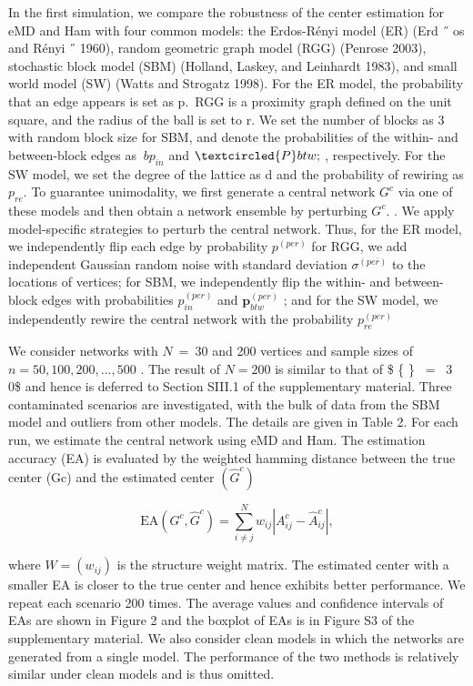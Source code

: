 \documentclass[
  10
]{article}
\begin{document}
In the first simulation, we compare the robustness of the center
estimation for eMD and Ham with four common models: the Erdos-Rényi
model (ER) (Erd ˝ os and Rényi ˝ 1960), random geometric graph model
(RGG) (Penrose 2003), stochastic block model (SBM) (Holland, Laskey, and
Leinhardt 1983), and small world model (SW) (Watts and Strogatz 1998).
For the ER model, the probability that an edge appears is set as p.~RGG
is a proximity graph defined on the unit square, and the radius of the
ball is set to r. We set the number of blocks as 3 with random block
size for SBM, and denote the probabilities of the within- and
between-block edges as \(\ b { p } _ { i n }\) and
\(\textcircled { P } b t w ;\) , respectively. For the SW model, we set
the degree of the lattice as d and the probability of rewiring as
\(\mathit { p } _ { r e } .\) To guarantee unimodality, we first
generate a central network \(G ^ { c }\) via one of these models and
then obtain a network ensemble by perturbing \(G ^ { c } .\) . We apply
model-specific strategies to perturb the central network. Thus, for the
ER model, we independently flip each edge by probability
\(p ^ { ( p e r ) }\) for RGG, we add independent Gaussian random noise
with standard deviation \(\sigma ^ { ( p e \bar { r } ) }\) to the
locations of vertices; for SBM, we independently flip the within- and
between-block edges with probabilities \(p _ { i n } ^ { ( p e r ) }\)
and \(\boldsymbol { p } _ { b t w } ^ { ( p e r ) }\) ; and for the SW
model, we independently rewire the central network with the probability
\(p _ { r e } ^ { ( p e r ) }\)

We consider networks with \(N ~ = ~ 3 0\) and 200 vertices and sample
sizes of \(n = 5 0 , 1 0 0 , 2 0 0 , . . . , 5 0 0\) . The result of
\(N = 2 0 0\) is similar to that of \$ \{  \} ~= ~3 0\$
and hence is deferred to Section SIII.1 of the supplementary material.
Three contaminated scenarios are investigated, with the bulk of data
from the SBM model and outliers from other models. The details are given
in Table 2. For each run, we estimate the central network using eMD and
Ham. The estimation accuracy (EA) is evaluated by the weighted hamming
distance between the true center (Gc) and the estimated center
\(( \hat { G } ^ { c } )\)

\[
\mathrm{EA} (G ^ {c}, \hat {G} ^ {c}) = \sum_ {i \neq j} ^ {N} w _ {i j} \left| A _ {i j} ^ {c} - \hat {A} _ {i j} ^ {c} \right|,\tag{12}
\]

where \(W = ( w _ { i j } )\) is the structure weight matrix. The
estimated center with a smaller EA is closer to the true center and
hence exhibits better performance. We repeat each scenario 200 times.
The average values and confidence intervals of EAs are shown in Figure 2
and the boxplot of EAs is in Figure S3 of the supplementary material. We
also consider clean models in which the networks are generated from a
single model. The performance of the two methods is relatively similar
under clean models and is thus omitted.
\end{document}
